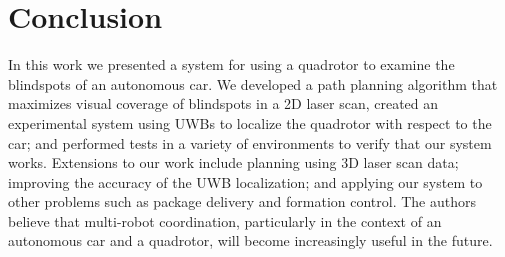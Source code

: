 
\section{Conclusion}

In this work we presented a system for using a quadrotor to examine the blindspots of an autonomous car. We developed a path planning algorithm that maximizes visual coverage of blindspots in a 2D laser scan, created an experimental system using UWBs to localize the quadrotor with respect to the car; and performed tests in a variety of environments to verify that our system works. Extensions to our work include planning using 3D laser scan data; improving the accuracy of the UWB localization; and applying our system to other problems such as package delivery and formation control. The authors believe that multi-robot coordination, particularly in the context of an autonomous car and a quadrotor, will become increasingly useful in the future.